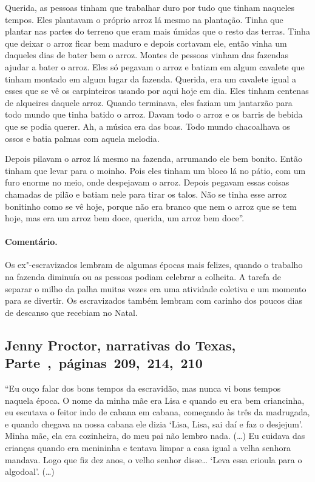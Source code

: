 Querida, as pessoas tinham que trabalhar duro por tudo que tinham
naqueles tempos. Eles plantavam o próprio arroz lá mesmo na plantação.
Tinha que plantar nas partes do terreno que eram mais úmidas que o resto
das terras. Tinha que deixar o arroz ficar bem maduro e depois cortavam
ele, então vinha um daqueles dias de bater bem o arroz. Montes de
pessoas vinham das fazendas ajudar a bater o arroz. Eles só pegavam o
arroz e batiam em algum cavalete que tinham montado em algum lugar da
fazenda. Querida, era um cavalete igual a esses que se vê os
carpinteiros usando por aqui hoje em dia. Eles tinham centenas de
alqueires daquele arroz. Quando terminava, eles faziam um jantarzão para
todo mundo que tinha batido o arroz. Davam todo o arroz e os barris de
bebida que se podia querer. Ah, a música era das boas. Todo mundo
chacoalhava os ossos e batia palmas com aquela melodia.

Depois pilavam o arroz lá mesmo na fazenda, arrumando ele bem bonito.
Então tinham que levar para o moinho. Pois eles tinham um bloco lá no
pátio, com um furo enorme no meio, onde despejavam o arroz. Depois
pegavam essas coisas chamadas de pilão e batiam nele para tirar os
talos. Não se tinha esse arroz bonitinho como se vê hoje, porque não era
branco que nem o arroz que se tem hoje, mas era um arroz bem doce,
querida, um arroz bem doce''.


\paragraph{Comentário.}\quad
{\small
Os ex"-escravizados lembram de algumas épocas mais felizes, quando o
trabalho na fazenda diminuía ou as pessoas podiam celebrar a colheita. A
tarefa de separar o milho da palha muitas vezes era uma atividade
coletiva e um momento para se divertir. Os escravizados também lembram com
carinho dos poucos dias de descanso que recebiam no Natal.
}

\subsection{Jenny Proctor, narrativas do Texas, Parte~,~páginas~209,~214,~210}
\label{ref216}

``Eu ouço falar dos bons tempos da escravidão, mas nunca vi bons tempos
naquela época. O nome da minha mãe era Lisa e quando eu era bem
criancinha, eu escutava o feitor indo de cabana em cabana, começando às
três da madrugada, e quando chegava na nossa cabana ele dizia `Lisa,
Lisa, sai daí e faz o desjejum'. Minha mãe, ela era cozinheira, do meu
pai não lembro nada. (\ldots{}) Eu cuidava das crianças quando era
menininha e tentava limpar a casa igual a velha senhora mandava. Logo
que fiz dez anos, o velho senhor disse\ldots{} `Leva essa crioula para o
algodoal'. (\ldots{})

